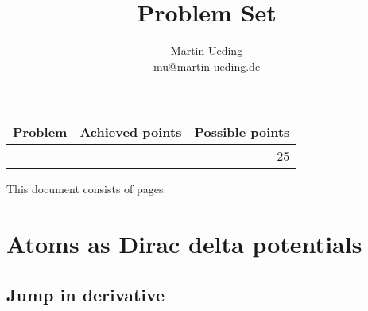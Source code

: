 \documentclass[11pt, english, fleqn, DIV=15, headinclude, BCOR=1cm]{scrartcl}
\title{Problem Set \arabic{problemset}}
\author{
    Martin Ueding \\ \small{\href{mailto:mu@martin-ueding.de}{mu@martin-ueding.de}}
}
\newcounter{totalpoints}
\newcommand\punkte[1]{#1\addtocounter{totalpoints}{#1}}
\begin{document}
\maketitle

\vspace{3ex}

\begin{center}
    \begin{tabular}{rrr}
        \toprule
        Problem & Achieved points & Possible points \\
        \midrule
        \nameref{homework:1} & & \punkte{25} \\
        \bottomrule
    \end{tabular}
\end{center}

\vspace{3ex}

\begin{center}
    \begin{small}
        This document consists of \pageref{LastPage} pages.
    \end{small}
\end{center}

\section{Atoms as Dirac delta potentials}
\label{homework:1}

\subsection{Jump in derivative}
\end{document}
